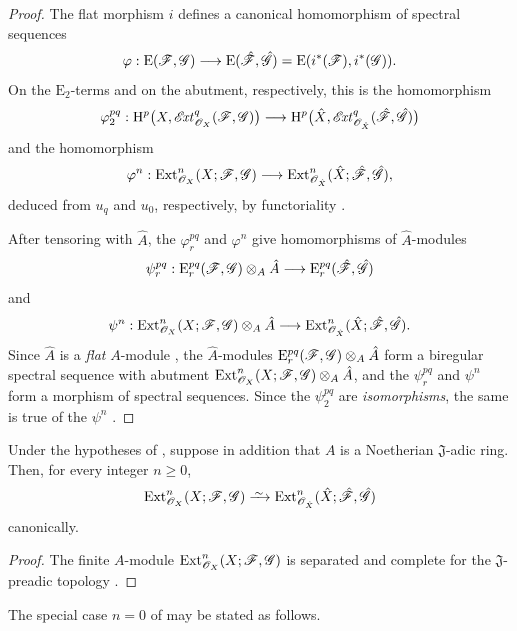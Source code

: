 \begin{proof}
The flat morphism $i$ defines a canonical homomorphism of spectral
sequences
\[
  \varphi:\mathrm{E}(\mathscr{F},\mathscr{G})
  \longrightarrow
  \mathrm{E}(\hat{\mathscr{F}},\hat{\mathscr{G}})
  =
  \mathrm{E}(i^*(\mathscr{F}),i^*(\mathscr{G})).
\]
On the $\mathrm{E}_2$-terms and on the abutment, respectively, this
is the homomorphism
\[
  \varphi_2^{pq}:
  \mathrm{H}^p\bigl(X,\mathscr{E}\!\mathit{xt}^q_{\mathscr{O}_X}(\mathscr{F},\mathscr{G})\bigr)
  \longrightarrow
  \mathrm{H}^p\bigl(\hat{X},
    \mathscr{E}\!\mathit{xt}^q_{\mathscr{O}_{\hat{X}}}
      (\hat{\mathscr{F}},\hat{\mathscr{G}})\bigr)
\]
and the homomorphism
\[
  \varphi^n:
  \operatorname{Ext}^n_{\mathscr{O}_X}(X;\mathscr{F},\mathscr{G})
  \longrightarrow
  \operatorname{Ext}^n_{\mathscr{O}_{\hat{X}}}
    (\hat{X};\hat{\mathscr{F}},\hat{\mathscr{G}}),
\]
deduced from $u_q$ and $u_0$, respectively, by functoriality
.

After tensoring with $\hat{A}$, the $\varphi_r^{pq}$ and
$\varphi^n$ give homomorphisms of $\hat{A}$-modules
\[
  \psi_r^{pq}:
  \mathrm{E}_r^{pq}(\mathscr{F},\mathscr{G})\otimes_A\hat{A}
  \longrightarrow
  \mathrm{E}_r^{pq}(\hat{\mathscr{F}},\hat{\mathscr{G}})
\]
and
\[
  \psi^n:
  \operatorname{Ext}^n_{\mathscr{O}_X}(X;\mathscr{F},\mathscr{G})\otimes_A\hat{A}
  \longrightarrow
  \operatorname{Ext}^n_{\mathscr{O}_{\hat{X}}}
    (\hat{X};\hat{\mathscr{F}},\hat{\mathscr{G}}).
\]
Since $\hat{A}$ is a \emph{flat} $A$-module , the
$\hat{A}$-modules $\mathrm{E}_r^{pq}(\mathscr{F},\mathscr{G})\otimes_A\hat{A}$
form a biregular spectral sequence with abutment $\operatorname{Ext}^n_{\mathscr{O}_X}(X;\mathscr{F},\mathscr{G})\otimes_A\hat{A}$,
and the $\psi_r^{pq}$ and $\psi^n$ form a morphism of spectral
sequences.  Since the $\psi_2^{pq}$ are \emph{isomorphisms}, the same is true
of the $\psi^n$ .
\end{proof}

\begin{corollary}[4.5.2]
\label{III.4.5.2}
Under the hypotheses of , suppose in addition that
$A$ is a Noetherian $\mathfrak J$-adic ring.  Then, for every integer
$n\geq0$,
\[
  \Ext^n_{\sh{O}_X}(X;\sh{F},\sh{G})
  \isoto
  \Ext^n_{\sh{O}_{\hat{X}}}
    (\hat{X};\hat{\sh{F}},\hat{\sh{G}})
\]
canonically.
\end{corollary}

\begin{proof}
The finite $A$-module
$\operatorname{Ext}^n_{\mathscr{O}_X}(X;\mathscr{F},\mathscr{G})$ is separated and complete for
the $\mathfrak J$-preadic topology .
\end{proof}

The special case $n=0$ of  may be stated as follows.

